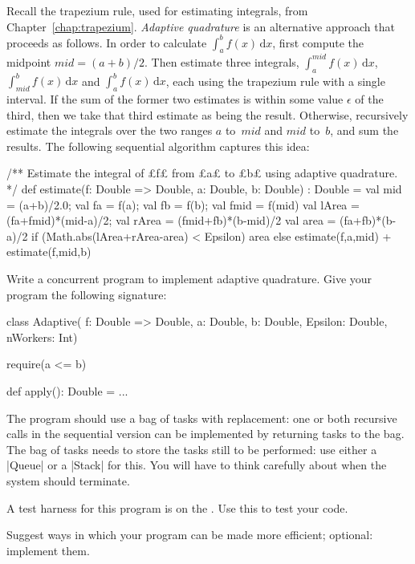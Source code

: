 \begin{question}
\def\integral#1#2{\int_{#1}^{#2} f(x)\,\mbox{d}x} 
%
Recall the trapezium rule, used for estimating integrals, from Chapter~\ref{chap:trapezium}.  \emph{Adaptive quadrature} is an
alternative approach that proceeds as follows.  In order to calculate
$\integral{a}{b}$, first compute the midpoint $mid = (a+b)/2$.  Then estimate
three integrals, $\integral{a}{mid}$, $\integral{mid}{b}$ and
$\integral{a}{b}$, each using the trapezium rule with a single interval.  If
the sum of the former two estimates is within some value $\epsilon$ of the
third, then we take that third estimate as being the result.  Otherwise,
recursively estimate the integrals over the two ranges $a$ to~$mid$ and $mid$
to~$b$, and sum the results.  The following sequential algorithm captures this
idea:
%
\begin{mysamepage}
\begin{scala}
  /** Estimate the integral of £f£ from £a£ to £b£ using adaptive quadrature. */
  def estimate(f: Double => Double, a: Double, b: Double) : Double = {
    val mid = (a+b)/2.0; val fa = f(a); val fb = f(b); val fmid = f(mid)
    val lArea = (fa+fmid)*(mid-a)/2; val rArea = (fmid+fb)*(b-mid)/2
    val area = (fa+fb)*(b-a)/2
    if (Math.abs(lArea+rArea-area) < Epsilon) area
    else estimate(f,a,mid) + estimate(f,mid,b)
  }
\end{scala}
\end{mysamepage}

Write a concurrent program to implement adaptive quadrature.  Give your
program the following signature:
\begin{scala}
class Adaptive(
    f: Double => Double, a: Double, b: Double, Epsilon: Double, nWorkers: Int){
  require(a <= b)

  def apply(): Double = ...
}
\end{scala}
%
The program should use a bag of tasks with replacement: one or both recursive
calls in the sequential version can be implemented by returning tasks to the
bag.  The bag of tasks needs to store the tasks still to be performed: use
either a |Queue| or a |Stack| for this.  You will have to think carefully
about when the system should terminate.

A test harness for this program is on the .  Use this
to test your code.

Suggest ways in which your program can be made more efficient; optional:
implement them.
\end{question}

